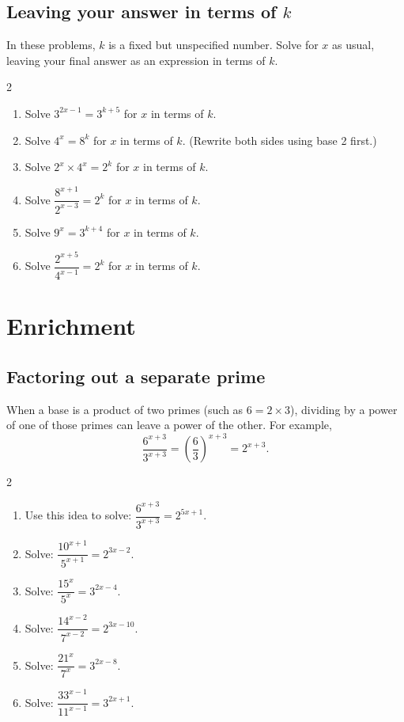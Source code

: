 \documentclass[11pt]{article}
\newcommand{\qspace}{\vspace{0.65cm}}
\newenvironment{qtwocol}{\begin{multicols}{2}\begin{enumerate}[resume]}{\end{enumerate}\end{multicols}}
\newenvironment{qtwocolstart}{\begin{multicols}{2}\begin{enumerate}}{\end{enumerate}\end{multicols}}
\begin{document}
\subsection*{Leaving your answer in terms of $k$}
In these problems, $k$ is a fixed but unspecified number. Solve for $x$ as usual, leaving your final answer as an expression in terms of $k$.

\begin{qtwocol}
  \item Solve $3^{2x-1} = 3^{k+5}$ for $x$ in terms of $k$.
  \qspace

  \item Solve $4^x = 8^k$ for $x$ in terms of $k$. (Rewrite both sides using base 2 first.)
  \qspace

  \item Solve $2^{x} \times 4^{x} = 2^{k}$ for $x$ in terms of $k$.
  \qspace

  \item Solve $\dfrac{8^{x+1}}{2^{x-3}} = 2^{k}$ for $x$ in terms of $k$.
  \qspace

  \item Solve $9^{x} = 3^{k+4}$ for $x$ in terms of $k$.
  \qspace

  \item Solve $\dfrac{2^{x+5}}{4^{x-1}} = 2^{k}$ for $x$ in terms of $k$.
  \qspace
\end{qtwocol}

\newpage
\section{Enrichment}

\subsection*{Factoring out a separate prime}
When a base is a product of two primes (such as $6 = 2 \times 3$), dividing by a power of one of those primes can leave a power of the other. For example,
\[
  \frac{6^{x+3}}{3^{x+3}} = \left(\frac{6}{3}\right)^{x+3} = 2^{x+3}.
\]

\begin{qtwocolstart}
  \item Use this idea to solve: $\dfrac{6^{x+3}}{3^{x+3}} = 2^{5x+1}$.
  \qspace

  \item Solve: $\dfrac{10^{x+1}}{5^{x+1}} = 2^{3x-2}$.
  \qspace

  \item Solve: $\dfrac{15^{x}}{5^{x}} = 3^{2x-4}$.
  \qspace

  \item Solve: $\dfrac{14^{x-2}}{7^{x-2}} = 2^{3x-10}$.
  \qspace

  \item Solve: $\dfrac{21^{x}}{7^{x}} = 3^{2x-8}$.
  \qspace

  \item Solve: $\dfrac{33^{x-1}}{11^{x-1}} = 3^{2x+1}$.
  \qspace
\end{qtwocolstart}
\end{document}
